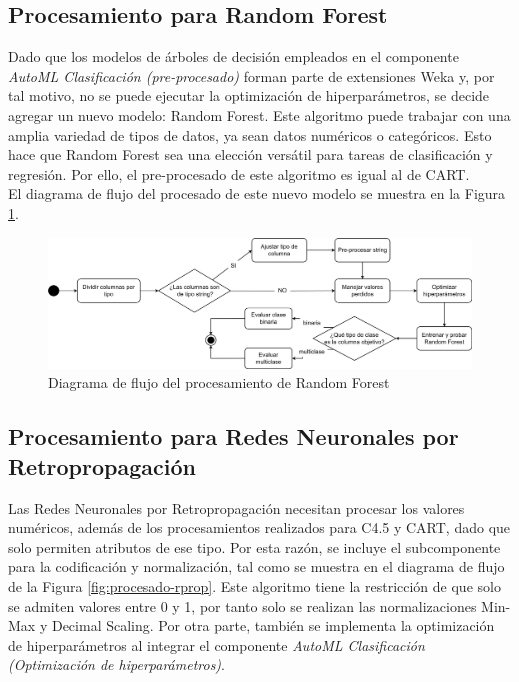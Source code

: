 \subsection{Procesamiento para Random Forest}
Dado que los modelos de árboles de decisión empleados en el componente \textit{AutoML Clasificación (pre-procesado)} forman parte de extensiones Weka y, por tal motivo, no se puede ejecutar la optimización de hiperparámetros, se decide agregar un nuevo modelo: Random Forest. Este algoritmo puede trabajar con una amplia variedad de tipos de datos, ya sean datos numéricos o categóricos. Esto hace que Random Forest sea una elección versátil para tareas de clasificación y regresión. Por ello, el pre-procesado de este algoritmo es igual al de CART. \\
El diagrama de flujo del procesado de este nuevo modelo se muestra en la Figura \ref{fig:procesado-rf}.

\begin{figure}[H]
	\centering
	\includegraphics[width=1\linewidth]{"figuras/capi 2/modelos/procesado rf.drawio"}
	\caption{Diagrama de flujo del procesamiento de Random Forest}
	\label{fig:procesado-rf}
\end{figure}


\subsection{Procesamiento para Redes Neuronales por Retropropagación}
Las Redes Neuronales por Retropropagación necesitan procesar los valores numéricos, además de los procesamientos realizados para C4.5 y CART, dado que solo permiten atributos de ese tipo. Por esta razón, se incluye el subcomponente para la codificación y normalización, tal como se muestra en el diagrama de flujo de la Figura \ref{fig:procesado-rprop}. Este algoritmo tiene la restricción de que solo se admiten valores entre 0 y 1, por tanto solo se realizan las normalizaciones Min-Max y Decimal Scaling. Por otra parte, también se implementa la optimización de hiperparámetros al integrar el componente \textit{AutoML Clasificación (Optimización de hiperparámetros)}.

